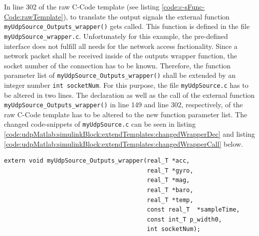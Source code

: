 In line 302 of the raw C-Code template (see listing \ref{code:c-sFunc-Code:rawTemplate}), to translate the output signals the external function \texttt{myUdpSource\_Outputs\_wrapper()} gets called. This function is defined in the file \texttt{myUdpSource\_wrapper.c}. Unfortunately for this example, the pre-defined interface does not fulfill all needs for the network access fnctionality. Since a network packet shall be received inside of the outputs wrapper function, the socket number of the connection has to be known. Therefore, the function parameter list of \texttt{myUdpSource\_Outputs\_wrapper()} shall be extended by an integer number \texttt{int socketNum}. For this purpose, the file \texttt{myUdpSource.c} has to be altered in two lines. The declaration as well as the call of the external function \texttt{myUdpSource\_Outputs\_wrapper()} in line 149 and line 302, respectively, of the raw C-Code template has to be altered to the new function parameter list. The changed code-snippets of \texttt{myUdpSource.c} can be seen in listing \ref{code:udpMatlab:simulinkBlock:extendTemplates:changedWrapperDec} and listing \ref{code:udpMatlab:simulinkBlock:extendTemplates:changedWrapperCall} below.

\begin{lstlisting}[caption={[\texttt{myUdpSource.c}, changed declaration of \texttt{myUdpSource\_Outputs\_wrapper()}]C-Code template file 'myUdpSource.c' with changed declaration of the external function \texttt{myUdpSource\_Outputs\_wrapper()} (code snippet of listing \ref{code:c-sFunc-Code:rawTemplate}, lines 149 ll.)},label=code:udpMatlab:simulinkBlock:extendTemplates:changedWrapperDec,firstnumber=149]
extern void myUdpSource_Outputs_wrapper(real_T *acc,
                                        real_T *gyro,
                                        real_T *mag,
                                        real_T *baro,
                                        real_T *temp, 
                                        const real_T  *sampleTime,
                                        const int_T p_width0,
                                        int socketNum);
\end{lstlisting}

